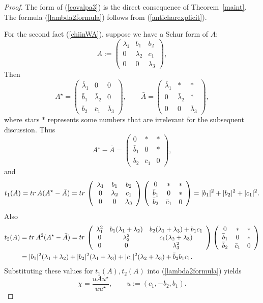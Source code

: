 \documentclass[10pt,a4paper,reqno]{amsart}
\newcommand{\zav}[1]{\left( #1 \right)}
\newcommand{\tr}{{\rm tr}\,}
\begin{document}
\begin{proof}
The form of (\ref{covalpa3}) is the direct consequence of Theorem~\ref{maint}. The formula (\ref{lambda2formula}) follows from (\ref{anticharexplicit}).

For the second fact (\ref{chiinWA}), suppose we have a Schur form of $A$:
$$
A:=\zav{\begin{array}{ccc}
\lambda_1 & b_1 & b_2 \\
0 & \lambda_2 & c_1 \\
0 & 0 & \lambda_3 
\end{array}
},
$$
Then
$$
A^\star=\zav{\begin{array}{ccc}
\bar \lambda_1 & 0 & 0 \\
\bar b_1 & \bar \lambda_2 & 0 \\
\bar b_2 & \bar c_1 & \bar \lambda_3 
\end{array}
},
\qquad
\bar A=\zav{\begin{array}{ccc}
\bar \lambda_1 & * & * \\
0 & \bar \lambda_2 & * \\
0 & 0 & \bar \lambda_3 
\end{array}
},
$$
where stars $*$ represents some numbers that are irrelevant for the subsequent discussion.
Thus
$$
A^\star-\bar A =\zav{\begin{array}{ccc}
0 & * & * \\
\bar b_1 & 0 & * \\
\bar b_2 & \bar c_1 & 0 
\end{array}
},
$$
and
$$
t_1(A)=\tr A(A^\star-\bar A)=\tr \zav{\begin{array}{ccc}
\lambda_1 & b_1 & b_2 \\
0 & \lambda_2 & c_1 \\
0 & 0 & \lambda_3 
\end{array}
}\zav{\begin{array}{ccc}
0 & * & * \\
\bar b_1 & 0 & * \\
\bar b_2 & \bar c_1 & 0 
\end{array}
}=|b_1|^2+|b_2|^2+|c_1|^2.
$$
Also
\begin{align*}
t_2(A)&=\tr A^2(A^\star-\bar A)=\tr \zav{\begin{array}{ccc}
\lambda_1^2 & b_1(\lambda_1+\lambda_2) & b_2(\lambda_1+\lambda_3)+b_1c_1 \\
0 & \lambda_2^2 & c_1(\lambda_2+\lambda_3) \\
0 & 0 & \lambda_3^2 
\end{array}
}\zav{\begin{array}{ccc}
0 & * & * \\
\bar b_1 & 0 & * \\
\bar b_2 & \bar c_1 & 0 
\end{array}
}\\
&=|b_1|^2(\lambda_1+\lambda_2)+|b_2|^2(\lambda_1+\lambda_3)+|c_1|^2(\lambda_2+\lambda_3)+\bar b_2 b_1 c_1.
\end{align*}
Substituting these values for $t_1(A), t_2(A)$ into (\ref{lambda2formula}) yields
\begin{equation}\label{chiexplicit}
\chi=\frac{u A u^\star}{u u^\star},\qquad u:=(c_1,-b_2,b_1).
\end{equation}
\end{proof}
\end{document}
